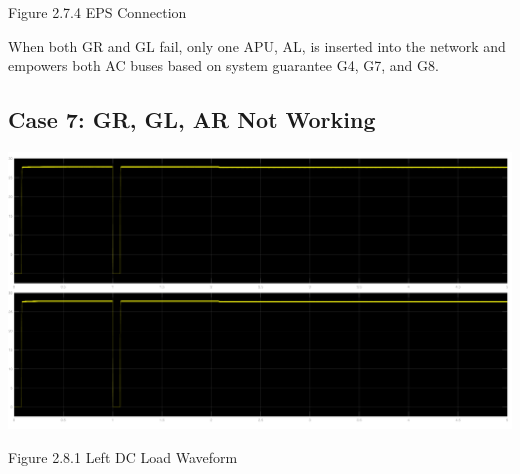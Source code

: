\documentclass{mcmthesis}
\begin{document}
\begin{center}
\small{Figure 2.7.4 EPS Connection}
\end{center}
When both GR and GL fail, only one APU, AL,  is inserted into the network and empowers both AC buses based on system guarantee G4, G7, and G8.
\pagebreak

\subsection{Case 7: GR, GL, AR Not Working}
\begin{center}
\includegraphics[trim= 0 0.28\imageheight{} 0 0, clip, width = 0.165\imageheight{}]{gl_gr_ar_load1.png}
\end{center}
\begin{center}
\small{Figure 2.8.1 Left DC Load Waveform}
\end{center}
\end{document}
